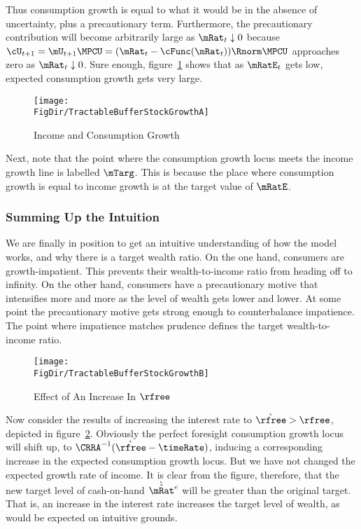 \documentclass{\handout}
\begin{document}
Thus consumption growth is equal to what it would be in the absence of
uncertainty, plus a precautionary term.  Furthermore, 
the precautionary contribution will become arbitrarily large as $\mRat_{t}
\downarrow 0$ because $\cU_{t+1} = \mU_{t+1}\MPCU  =
(\mRat_{t}-\cFunc(\mRat_{t}))\Rnorm\MPCU$ approaches zero as $\mRat_{t} \downarrow 0$.  Sure
enough, figure~\ref{fig:GrowthA} shows that as $\mRatE_{t}$
gets low, expected consumption growth gets very large.


\begin{figure}
\caption{Income and Consumption Growth}\label{fig:GrowthA}
\texttt{[image: \\FigDir/TractableBufferStockGrowthA]}
\end{figure}


Next, note that the point where the consumption growth locus meets the income growth line is labelled $\mTarg$.  This is because the place where consumption growth is equal to income growth is at the target value of $\mRatE$.





\subsubsection{Summing Up the Intuition}
We are finally in position to get an intuitive understanding of how the
model works, and why there is a target wealth ratio.  On the one hand,
consumers are growth-impatient.  This prevents their wealth-to-income ratio
from heading off to infinity.  On the other hand, consumers have
a precautionary motive that intensifies more and more as the level of
wealth gets lower and lower.  At some point the precautionary motive
gets strong enough to counterbalance impatience.  The point where impatience matches prudence defines the
target wealth-to-income ratio.


\begin{figure}
\caption{Effect of An Increase In $\rfree$}
\texttt{[image: \\FigDir/TractableBufferStockGrowthB]}
\label{fig:GrowthB}
\end{figure}


Now consider the results of increasing the interest rate to
$\grave{\rfree}>\rfree$, depicted in figure~\ref{fig:GrowthB}.  Obviously the perfect foresight consumption
growth locus will shift up, to $\CRRA^{-1}(\grave{\rfree}-\timeRate)$,
inducing a corresponding increase in the expected consumption growth
locus.  But we have not changed the expected growth rate of income.
It is clear from the figure, therefore, that the new target level of
cash-on-hand $\grave{\check{\mRat}}^{e}$ will be greater than the original target.
That is, an increase in the interest rate increases the target level
of wealth, as would be expected on intuitive grounds.
\end{document}
